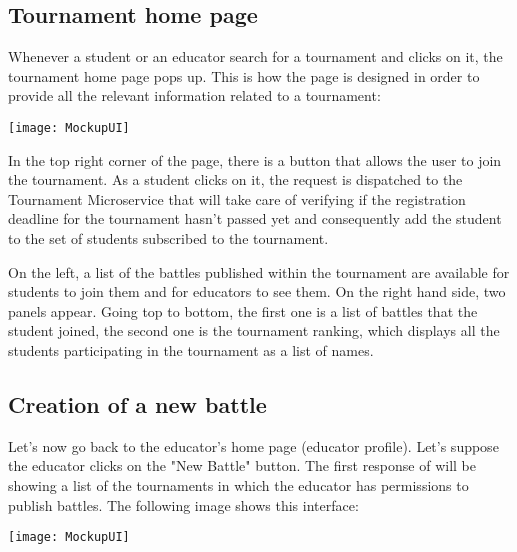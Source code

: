 \begin{minipage}{\linewidth}

\subsection{Tournament home page}
Whenever a student or an educator search for a tournament and clicks on it, the tournament home page pops up. This is how the page is designed in order to provide all the relevant information related to a tournament:

\begin{center}
	\texttt{[image: MockupUI]}
\end{center}

\end{minipage}

In the top right corner of the page, there is a button that allows the user to join the tournament. As a student clicks on it, the request is dispatched to the Tournament Microservice that will take care of verifying if the registration deadline for the tournament hasn't passed yet and consequently add the student to the set of students subscribed to the tournament.

On the left, a list of the battles published within the tournament are available for students to join them and for educators to see them. 
On the right hand side, two panels appear. Going top to bottom, the first one is a list of battles that the student joined, the second one is the tournament ranking, which displays all the students participating in the tournament as a list of names.


\begin{minipage}{\linewidth}

\subsection{Creation of a new battle}

Let's now go back to the educator's home page (educator profile). Let's suppose the educator clicks on the "New Battle" button. The first response of \app will be showing a list of the tournaments in which the educator has permissions to publish battles. The following image shows this interface:

\begin{center}
	\texttt{[image: MockupUI]}
\end{center}

\end{minipage}

